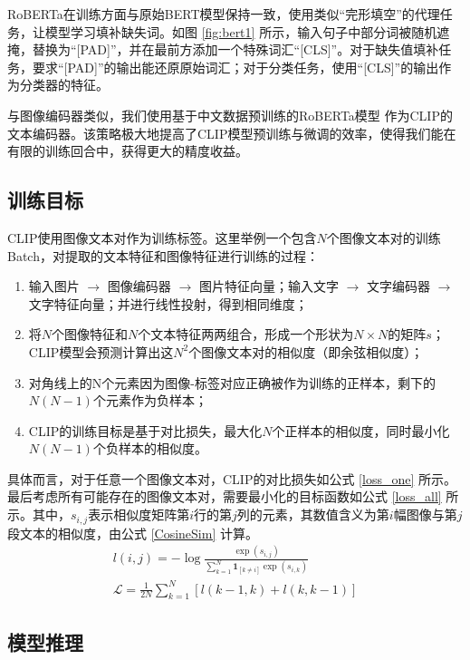 \documentclass[a4paper]{zreport}
\begin{document}
RoBERTa在训练方面与原始BERT模型保持一致，使用类似“完形填空”的代理任务，让模型学习填补缺失词。如图 \ref{fig:bert1} 所示，输入句子中部分词被随机遮掩，替换为“[PAD]”，并在最前方添加一个特殊词汇“[CLS]”。对于缺失值填补任务，要求“[PAD]”的输出能还原原始词汇；对于分类任务，使用“[CLS]”的输出作为分类器的特征。

与图像编码器类似，我们使用基于中文数据预训练的RoBERTa模型 \cite{cn-roberta} 作为CLIP的文本编码器。该策略极大地提高了CLIP模型预训练与微调的效率，使得我们能在有限的训练回合中，获得更大的精度收益。


\subsection{训练目标}

CLIP使用图像文本对作为训练标签。这里举例一个包含$N$个图像文本对的训练Batch，对提取的文本特征和图像特征进行训练的过程：

\begin{enumerate}
\item 输入图片 $\rightarrow$ 图像编码器 $\rightarrow$ 图片特征向量；输入文字 $\rightarrow$ 文字编码器 $\rightarrow$ 文字特征向量；并进行线性投射，得到相同维度；
\item 将$N$个图像特征和$N$个文本特征两两组合，形成一个形状为$N \times N$的矩阵$s$；
CLIP模型会预测计算出这$N^2$个图像文本对的相似度（即余弦相似度）；
\item 对角线上的N个元素因为图像-标签对应正确被作为训练的正样本，剩下的$N(N-1)$个元素作为负样本；
\item CLIP的训练目标是基于对比损失，最大化$N$个正样本的相似度，同时最小化$N(N-1)$个负样本的相似度。
\end{enumerate}

具体而言，对于任意一个图像文本对，CLIP的对比损失如公式 \eqref{loss_one} 所示。最后考虑所有可能存在的图像文本对，需要最小化的目标函数如公式 \eqref{loss_all} 所示。其中，$s_{i,j}$表示相似度矩阵第$i$行的第$j$列的元素，其数值含义为第$i$幅图像与第$j$段文本的相似度，由公式 \eqref{CosineSim} 计算。
\begin{gather}
l(i,j)=-\log\frac{\exp(s_{i,j})}{\sum_{k=1}^{N} \mathbf{1}_{\left[k \ne i\right]} \exp(s_{i,k})}\label{loss_one}\\
\mathcal{L}=\frac{1}{2N}\sum_{k=1}^N[l(k-1,k)+l(k,k-1)]\label{loss_all}
\end{gather}


\subsection{模型推理}
\end{document}
